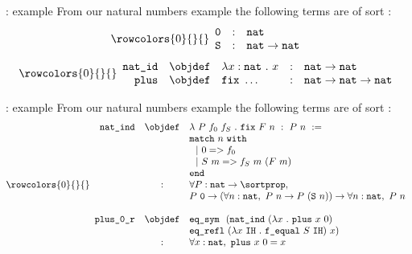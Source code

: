 \documentclass[department=ds, notes={hide notes}, slidesperpage=1]{beamerruhuisstijl}
\begin{document}
\begin{frame}{\pcic: example}
From our natural numbers example the following terms are of sort \sortset:
$$
	\rowcolors{0}{}{}
	\begin{array}{rcl}
		\texttt{0} & : & \texttt{nat} \\
		\texttt{S} & : & \texttt{nat} \rightarrow \texttt{nat}
	\end{array}
$$
$$
	\rowcolors{0}{}{}
	\begin{array}{rclcl}
		\texttt{nat\_id} & \objdef & \lambda x : \texttt{nat}~.~x & : & \texttt{nat} \rightarrow \texttt{nat} \\
		\texttt{plus} & \objdef & \texttt{fix}~\ldots & : & \texttt{nat} \rightarrow \texttt{nat} \rightarrow \texttt{nat} \\
	\end{array}
$$
\end{frame}

\begin{frame}{\pcic: example}
From our natural numbers example the following terms are of sort \sortprop:
$$
	\rowcolors{0}{}{}
	\begin{array}{rcl}
		\texttt{nat\_ind} & \objdef & \lambda~P~f_0~f_S ~.~ \texttt{fix}~F~n ~:~ P~n ~:= \\
			&   &  \texttt{match}~ n ~\texttt{with} \\
			&   &  ~~| ~0 => f_0 \\
			&	&  ~~| ~S~m => f_S~m~(F~m) \\
			&	&  \texttt{end} \\
			& : &  \forall P : \texttt{nat} \rightarrow \sortprop,\\
			&   & P~\texttt{0} \rightarrow (\forall n : \texttt{nat},~ P~n \rightarrow P~(\texttt{S}~n)) \rightarrow \forall n : \texttt{nat},~ P~n \\
		\\
		\texttt{plus\_0\_r} & \objdef & \texttt{eq\_sym}
							~~(\texttt{nat\_ind}~(\lambda x~.~\texttt{plus}~x~0)\\
							& & \texttt{eq\_refl}~(\lambda x~\texttt{IH}~.~\texttt{f\_equal}~S~\texttt{IH})~x) \\
							& : & \forall x : \texttt{nat},~ \texttt{plus}~x~0 = x \\
	\end{array}
$$
\end{frame}
\end{document}
